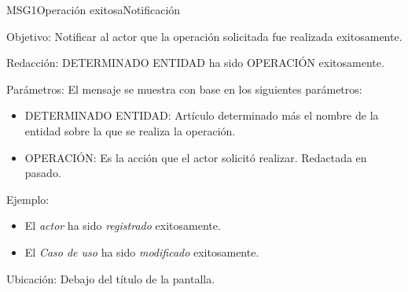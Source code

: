 \begin{mensaje}{MSG1}{Operación exitosa}{Notificación}
	\item [Objetivo:] Notificar al actor que la operación solicitada fue realizada exitosamente.
	\item[Redacción:] DETERMINADO ENTIDAD ha sido OPERACIÓN exitosamente.
	\item[Parámetros:] El mensaje se muestra con base en los siguientes parámetros:
		\begin{itemize}
 			\item DETERMINADO ENTIDAD: Artículo determinado más el nombre de la entidad sobre la que se realiza la operación.
 			\item OPERACIÓN: Es la acción que el actor solicitó realizar. Redactada en pasado.
		\end{itemize}
	\item[Ejemplo:] \begin{itemize}
		\item El {\em actor} ha sido {\em registrado} exitosamente.
		\item El {\em Caso de uso} ha sido {\em modificado} exitosamente.
	\end{itemize}
	\item [Ubicación:] Debajo del título de la pantalla.
\end{mensaje}